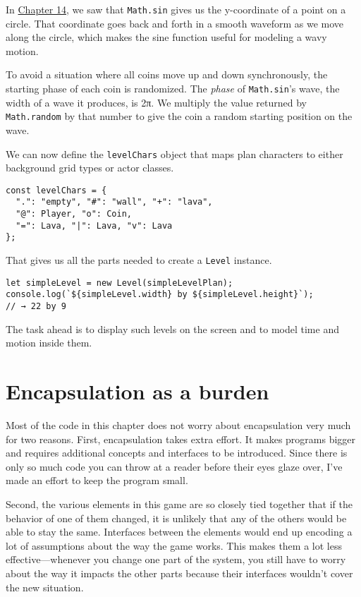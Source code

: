 In \hyperref[dom.sin_cos]{Chapter 14}, we saw that \lstinline`Math.sin` gives us the y-coordinate of a point on a circle. That coordinate goes back and forth in a smooth waveform as we move along the circle, which makes the sine function useful for modeling a wavy motion.

To avoid a situation where all coins move up and down synchronously, the starting phase of each coin is randomized. The \emph{phase} of \lstinline`Math.sin`'s wave, the width of a wave it produces, is 2π. We multiply the value returned by \lstinline`Math.random` by that number to give the coin a random starting position on the wave.

We can now define the \lstinline`levelChars` object that maps plan characters to either background grid types or actor classes.

\begin{lstlisting}
const levelChars = {
  ".": "empty", "#": "wall", "+": "lava",
  "@": Player, "o": Coin,
  "=": Lava, "|": Lava, "v": Lava
};
\end{lstlisting}
\noindent

That gives us all the parts needed to create a \lstinline`Level` instance.

\begin{lstlisting}
let simpleLevel = new Level(simpleLevelPlan);
console.log(`${simpleLevel.width} by ${simpleLevel.height}`);
// → 22 by 9
\end{lstlisting}
\noindent

The task ahead is to display such levels on the screen and to model time and motion inside them.

\section{Encapsulation as a burden}

Most of the code in this chapter does not worry about encapsulation very much for two reasons. First, encapsulation takes extra effort. It makes programs bigger and requires additional concepts and interfaces to be introduced. Since there is only so much code you can throw at a reader before their eyes glaze over, I've made an effort to keep the program small.

Second, the various elements in this game are so closely tied together that if the behavior of one of them changed, it is unlikely that any of the others would be able to stay the same. Interfaces between the elements would end up encoding a lot of assumptions about the way the game works. This makes them a lot less effective—whenever you change one part of the system, you still have to worry about the way it impacts the other parts because their interfaces wouldn't cover the new situation.

